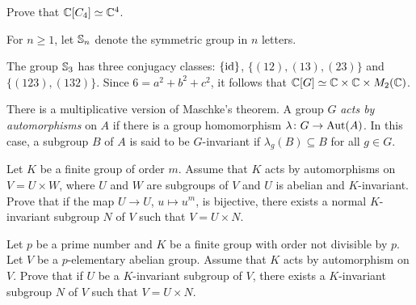 \begin{exercise}
\label{xca:C4}
    Prove that $\mathbb{C}[C_4]\simeq\mathbb{C}^4$. 
\end{exercise}

For $n\geq1$, let $\mathbb{S}_n$ denote the symmetric group in $n$ letters. 

\begin{example}
    The group $\mathbb{S}_3$ has three conjugacy classes:
    $\{\operatorname{id}\}$, $\{(12),(13),(23)\}$ and $\{(123),(132)\}$. 
    Since $6=a^2+b^2+c^2$, it follows that 
    $\mathbb{C}[G]\simeq\mathbb{C}\times\mathbb{C}\times M_2(\mathbb{C})$. 
\end{example}    





There is a multiplicative version of Maschke's theorem. A group $G$ \emph{acts 
by automorphisms} on $A$ if there is a group homomorphism 
$\lambda\colon G\to\operatorname{Aut}(A)$. In this case, a subgroup $B$ of $A$ is said to be 
$G$-invariant if $\lambda_g(B)\subseteq B$ for all $g\in G$. 

\begin{bonus}
\label{xca:Maschke_multiplicative}
    Let $K$ be a finite group of order $m$. Assume that 
    $K$ acts by automorphisms on $V=U\times W$, where
    $U$ and $W$ are subgroups of $V$ and $U$ is abelian and $K$-invariant. Prove that 
    if the map $U\to U$, $u\mapsto u^m$, is bijective, 
    there exists a normal $K$-invariant subgroup $N$ of $V$ such that $V=U\times N$. 
\end{bonus}

\begin{bonus}
    Let $p$ be a prime number and $K$ be a finite
    group with order not divisible by $p$. Let $V$ be
    a $p$-elementary abelian group. Assume that $K$ acts
    by automorphism on $V$. Prove that if $U$ be a $K$-invariant subgroup of $V$, 
    there exists a $K$-invariant subgroup $N$ of $V$ 
    such that $V=U\times N$. 
\end{bonus}


